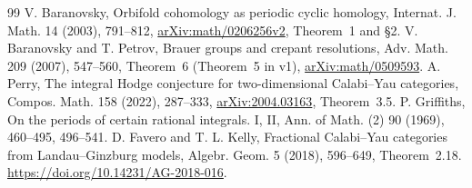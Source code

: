 \begin{thebibliography}{99}
 V. Baranovsky,
Orbifold cohomology as periodic cyclic homology, Internat. J. Math. 14 (2003), 791--812,
\href{https://arxiv.org/abs/math/0206256}{arXiv:math/0206256v2}, Theorem~1 and \S2.
 V. Baranovsky and T. Petrov,
Brauer groups and crepant resolutions, Adv. Math. 209 (2007), 547--560,
Theorem~6 (Theorem~5 in v1), \href{https://arxiv.org/abs/math/0509593}{arXiv:math/0509593}.
 A. Perry, The integral Hodge conjecture for two-dimensional
Calabi--Yau categories, Compos. Math. 158 (2022), 287--333,
\href{https://arxiv.org/abs/2004.03163}{arXiv:2004.03163}, Theorem~3.5.
 P. Griffiths, On the periods of certain rational integrals.
I, II, Ann. of Math. (2) 90 (1969), 460--495, 496--541.
D. Favero and T. L. Kelly, Fractional Calabi--Yau categories from Landau--Ginzburg models,
Algebr. Geom. 5 (2018), 596--649, Theorem~2.18.
\url{https://doi.org/10.14231/AG-2018-016}.
\end{thebibliography}
